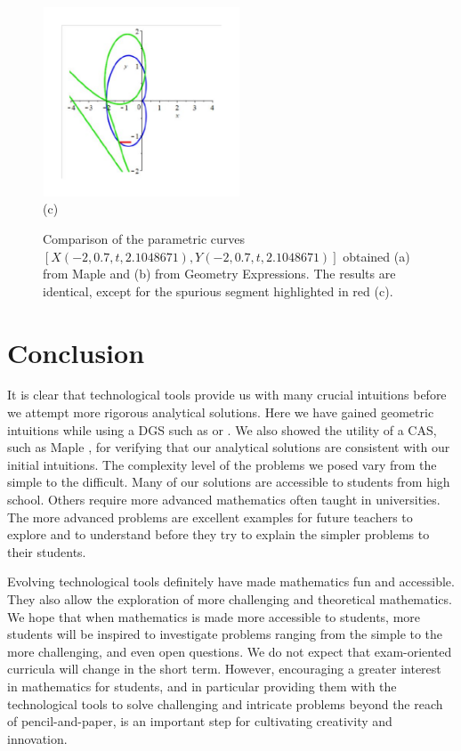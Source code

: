 \documentclass[12pt,a4paper]{article}%
\begin{document}
\begin{figure}[htpb]
\begin{center}
{\begin{center}
\includegraphics[natheight=2.849000in,natwidth=2.977600in,height=2.2166in,width=2.3168in]{PJH75I1Y.pdf}
 \\ (c)
\end{center}}

\end{center}
\caption{Comparison of the parametric curves $[X(-2,0.7,t,2.1048671), Y(-2,0.7,t,2.1048671)]$
              obtained (a) from Maple and (b) from Geometry Expressions.
              The results are identical, except for the spurious segment highlighted in red (c).}
\label{fig15}
\end{figure}

\section{Conclusion} \label{conc}

It is clear that technological tools provide us with many crucial intuitions
before we attempt more rigorous analytical solutions. Here we have gained
geometric intuitions while using a DGS such as \cite{CP} or \cite{GE}.
We also showed the utility of a CAS, such as Maple \cite{Maple}, for verifying that our
analytical solutions are consistent with our initial intuitions. The
complexity level of the problems we posed vary from the simple to the
difficult. Many of our solutions are accessible to students from high school.
Others require more advanced mathematics often taught in universities.
The more advanced problems
are excellent examples for future teachers to explore and to understand before they
try to explain the simpler problems to their students.

Evolving technological tools definitely have made mathematics fun and
accessible. They also allow the exploration of more
challenging and theoretical mathematics. We hope that when mathematics is made
more accessible to students, more students will be inspired to
investigate problems ranging from the simple to the more challenging, and even open questions.
We do not expect that exam-oriented curricula will change in the short term.
However, encouraging a greater interest in mathematics for students, and in
particular providing them with the technological tools to solve challenging
and intricate problems beyond the reach of pencil-and-paper, is an important
step for cultivating creativity and innovation.
\end{document}
